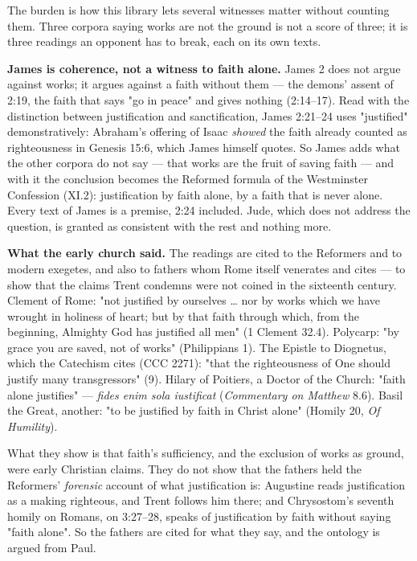 \documentclass[11pt]{article}
\begin{document}
The burden is how this library lets several witnesses matter without counting them. Three corpora saying works are not the ground is not a score of three; it is three readings an opponent has to break, each on its own texts.

\textbf{James is coherence, not a witness to faith alone.} James 2 does not argue against works; it argues against a faith without them — the demons' assent of 2:19, the faith that says "go in peace" and gives nothing (2:14–17). Read with the distinction between justification and sanctification, James 2:21–24 uses "justified" demonstratively: Abraham's offering of Isaac \emph{showed} the faith already counted as righteousness in Genesis 15:6, which James himself quotes. So James adds what the other corpora do not say — that works are the fruit of saving faith — and with it the conclusion becomes the Reformed formula of the Westminster Confession (XI.2): justification by faith alone, by a faith that is never alone. Every text of James is a premise, 2:24 included. Jude, which does not address the question, is granted as consistent with the rest and nothing more.

\textbf{What the early church said.} The readings are cited to the Reformers and to modern exegetes, and also to fathers whom Rome itself venerates and cites — to show that the claims Trent condemns were not coined in the sixteenth century. Clement of Rome: "not justified by ourselves … nor by works which we have wrought in holiness of heart; but by that faith through which, from the beginning, Almighty God has justified all men" (1 Clement 32.4). Polycarp: "by grace you are saved, not of works" (Philippians 1). The Epistle to Diognetus, which the Catechism cites (CCC 2271): "that the righteousness of One should justify many transgressors" (9). Hilary of Poitiers, a Doctor of the Church: "faith alone justifies" — \emph{fides enim sola iustificat} (\emph{Commentary on Matthew} 8.6). Basil the Great, another: "to be justified by faith in Christ alone" (Homily 20, \emph{Of Humility}).

What they show is that faith's sufficiency, and the exclusion of works as ground, were early Christian claims. They do not show that the fathers held the Reformers' \emph{forensic} account of what justification is: Augustine reads justification as a making righteous, and Trent follows him there; and Chrysostom's seventh homily on Romans, on 3:27–28, speaks of justification by faith without saying "faith alone". So the fathers are cited for what they say, and the ontology is argued from Paul.
\end{document}

